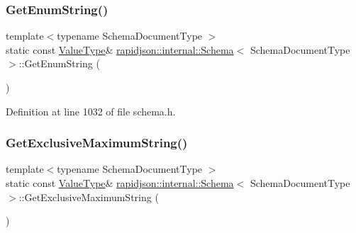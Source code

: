 \subsubsection{\texorpdfstring{GetEnumString()}{GetEnumString()}}
{\footnotesize\ttfamily template$<$typename Schema\+Document\+Type $>$ \\
static const \mbox{\hyperlink{classrapidjson_1_1internal_1_1_schema_a3979a9083c598195927c08c6e3ba91d1}{Value\+Type}}\& \mbox{\hyperlink{classrapidjson_1_1internal_1_1_schema}{rapidjson\+::internal\+::\+Schema}}$<$ Schema\+Document\+Type $>$\+::Get\+Enum\+String (\begin{DoxyParamCaption}{ }\end{DoxyParamCaption})\hspace{0.3cm}{\ttfamily [static]}}



Definition at line 1032 of file schema.\+h.


\begin{DoxyCode}{0}

\end{DoxyCode}
\mbox{\label{classrapidjson_1_1internal_1_1_schema_aeac03f4d7ef50d2cfcfbacaccf9b691b}} 
\subsubsection{\texorpdfstring{GetExclusiveMaximumString()}{GetExclusiveMaximumString()}}
{\footnotesize\ttfamily template$<$typename Schema\+Document\+Type $>$ \\
static const \mbox{\hyperlink{classrapidjson_1_1internal_1_1_schema_a3979a9083c598195927c08c6e3ba91d1}{Value\+Type}}\& \mbox{\hyperlink{classrapidjson_1_1internal_1_1_schema}{rapidjson\+::internal\+::\+Schema}}$<$ Schema\+Document\+Type $>$\+::Get\+Exclusive\+Maximum\+String (\begin{DoxyParamCaption}{ }\end{DoxyParamCaption})\hspace{0.3cm}{\ttfamily [static]}}



